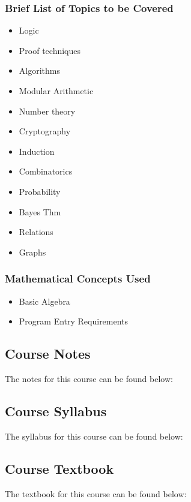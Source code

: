 {\begin{highlight}[\CSPBDisc]
        \subsubsection*{Brief List of Topics to be Covered}
    
        \begin{itemize}
            \item Logic
            \item Proof techniques
            \item Algorithms
            \item Modular Arithmetic
            \item Number theory
            \item Cryptography
            \item Induction
            \item Combinatorics
            \item Probability
            \item Bayes Thm
            \item Relations
            \item Graphs
        \end{itemize}
    
        \subsubsection*{Mathematical Concepts Used}
    
        \begin{itemize}
            \item Basic Algebra
            \item Program Entry Requirements
        \end{itemize}
    \end{highlight}
}

\subsection{Course Notes}

The notes for this course can be found below: 

\subsection{Course Syllabus}

The syllabus for this course can be found below: 

\subsection{Course Textbook}

The textbook for this course can be found below: 